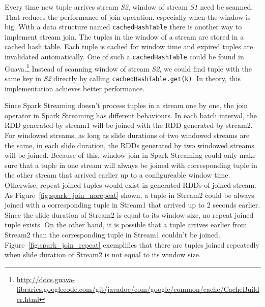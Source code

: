 Every time new tuple arrives stream \textit{S2}, window of stream \textit{S1} need be scanned. That reduces the performance of join operation, especially when the window is big. With a data structure named \texttt{cachedHashTable} there is another way to implement stream join. The tuples in the window of a stream are stored in a cached hash table. Each tuple is cached for window time and expired tuples are invalidated automatically. One of such a \texttt{cachedHashTable} could be found in Guava.\footnote{\url{http://docs.guava-libraries.googlecode.com/git/javadoc/com/google/common/cache/CacheBuilder.html}} Instead of scanning window of stream \textit{S2}, we could find tuple with the same key in \textit{S2} directly by calling \texttt{cachedHashTable.get(k)}. In theory, this implementation achieves better performance. 

Since Spark Streaming doesn't process tuples in a stream one by one, the join operator in Spark Streaming has different behaviours. In each batch interval, the RDD generated by stream1 will be joined with the RDD generated by stream2. For windowed streams, as long as slide durations of two windowed streams are the same, in each slide duration, the RDDs generated by two windowed streams will be joined. Because of this, window join in Spark Streaming could only make sure that a tuple in one stream will always be joined with corresponding tuple in the other stream that arrived earlier up to a configureable window time. Otherwise, repeat joined tuples would exist in generated RDDs of joined stream. As Figure~\ref{fig:spark_join_norepeat} shown, a tuple in Stream2 could be always joined with a corresponding tuple in Stream1 that arrived up to 2 seconds earlier. Since the slide duration of Stream2 is equal to its window size, no repeat joined tuple exists. On the other hand, it is possible that a tuple arrives earlier from Stream2 than the corresponding tuple in Stream1 couldn't be joined. Figure~\ref{fig:spark_join_repeat} exemplifies that there are tuples joined repeatedly  when slide duration of Stream2 is not equal to its window size.

